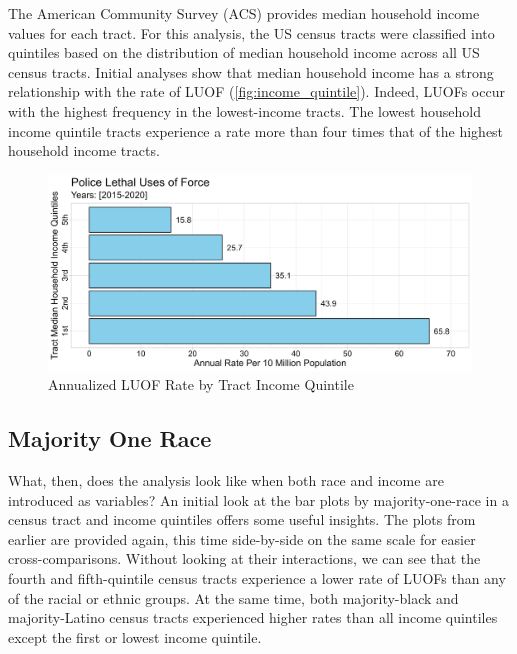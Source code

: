\documentclass[12pt]{article}
\begin{document}
The American Community Survey (ACS) provides median household income values for each tract. For this analysis, the US census tracts were classified into quintiles based on the distribution of median household income across all US census tracts. Initial analyses show that median household income has a strong relationship with the rate of LUOF (\autoref{fig:income_quintile}). Indeed, LUOFs occur with the highest frequency in the lowest-income tracts. The lowest household income quintile tracts experience a rate more than four times that of the highest household income tracts.

\begin{figure}[H]
  \centering %
  \includegraphics[width=\linewidth]{images/income_quintiles_only_ind}
  \captionsetup{justification=centering, singlelinecheck=false, margin=2cm}
  \caption[Annualized LUOF Rate by Tract Income Quintile]{Annualized LUOF Rate by Tract Income Quintile}
  \label{fig:income_quintile}
\end{figure}

\subsection{Majority One Race}

What, then, does the analysis look like when both race and income are introduced as
\noindent{}variables? An initial look at the bar plots by majority-one-race in a census tract and income quintiles offers some useful insights. The plots from earlier are provided again, this time side-by-side on the same scale for easier cross-comparisons. Without looking at their interactions, we can see that the fourth and fifth-quintile census tracts experience a lower rate of LUOFs than any of the racial or ethnic groups. At the same time, both majority-black and majority-Latino census tracts experienced higher rates than all income quintiles except the first or lowest income quintile.
\end{document}
